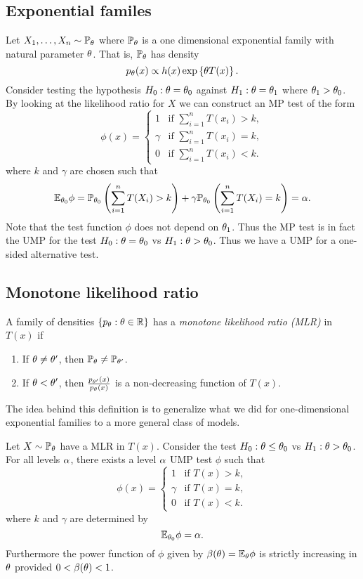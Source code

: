 \subsection{Exponential familes}
Let $X_1,\ldots, X_n \sim {\mathbb{P}}_{\theta}$ where ${\mathbb{P}}_{\theta}$ is a one dimensional exponential family with natural parameter ${\theta}$. That is, ${\mathbb{P}}_{\theta}$ has density
\[p_{\theta}(x) \propto h(x)\exp\left\{{\theta} T(x)\right\}. \]
Consider testing the hypothesis $H_0:{\theta}={\theta}_0$ against $H_1 : {\theta} = {\theta}_1$ where ${\theta}_1 > {\theta}_0$. By looking at the likelihood ratio for $X$ we can construct an MP test of the form 
\[\phi(x) = \begin{cases}
    1 & \text{if } \sum_{i=1}^n T(x_i) > k,\\
    \gamma & \text{if } \sum_{i=1}^n T(x_i) = k,\\
    0 & \text{if } \sum_{i=1}^n T(x_i) < k.
\end{cases}\]
where $k$ and $\gamma$ are chosen such that
\[{\mathbb{E}}_{{\theta}_0}\phi = {\mathbb{P}}_{{\theta}_0}\left(\sum_{i=1}^n T(X_i)> k\right) +\gamma {\mathbb{P}}_{{\theta}_0}\left(\sum_{i=1}^n T(X_i) = k\right)={\alpha}.\]
Note that the test function $\phi$ does not depend on ${\theta}_1$. Thus the MP test is in fact the UMP for the test $H_0 : {\theta} = {\theta}_0$ vs $H_1 : {\theta} > {\theta}_0$. Thus we have a UMP for a one-sided alternative test.
\subsection{Monotone likelihood ratio}
\begin{defn}
    A family of densities $\{p_{\theta}: {\theta} \in {\mathbb R}\}$ has a \emph{monotone likelihood ratio (MLR)} in $T(x)$ if 
    \begin{enumerate}
        \item If ${\theta} \neq {\theta}'$, then ${\mathbb{P}}_{\theta} \neq {\mathbb{P}}_{{\theta}'}$.
        \item If ${\theta} < {\theta}'$, then $\frac{p_{{\theta}'}(x)}{p_{{\theta}}(x)}$ is a non-decreasing function of $T(x)$.
    \end{enumerate}
\end{defn}
The idea behind this definition is to generalize what we did for one-dimensional exponential families to a more general class of models.
\begin{thrm}
    Let $X \sim {\mathbb{P}}_{\theta}$ have a MLR in $T(x)$. Consider the test $H_0 : {\theta} \le {\theta}_0$ vs $H_1 : {\theta} >{\theta}_0$. For all levels ${\alpha}$, there exists a level ${\alpha}$ UMP test $\phi$ such that 
    \[\phi(x) = \begin{cases}
        1 &\text{if } T(x) > k,\\
        \gamma &\text{if } T(x) = k,\\
        0 & \text{if }T(x) < k.
    \end{cases} \]
    where $k$ and $\gamma$ are determined by 
    \[{\mathbb{E}}_{{\theta}_0}\phi={\alpha}. \]
    Furthermore the power function of $\phi$ given by $\beta({\theta}) = {\mathbb{E}}_{\theta} \phi$ is strictly increasing in ${\theta}$ provided $0 < \beta({\theta}) < 1$.
\end{thrm}
